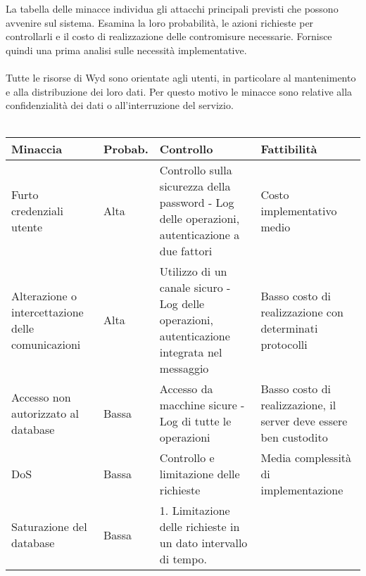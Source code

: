 La tabella delle minacce individua gli attacchi principali previsti che possono avvenire sul sistema.
Esamina la loro probabilità, le azioni richieste per controllarli e il costo di realizzazione delle contromisure necessarie.
Fornisce quindi una prima analisi sulle necessità implementative.\\
\\
Tutte le risorse di Wyd sono orientate agli utenti,
in particolare al mantenimento e alla distribuzione dei loro dati.
Per questo motivo le minacce sono relative alla confidenzialità dei dati o
all'interruzione del servizio.\\
\\
\begin{longtable}{|P{3.3cm}|P{1.6cm}|P{6.2cm}|P{4cm}|}
    \hline
    \textbf{Minaccia}                                                                           & \textbf{Probab.}                    & \textbf{Controllo}                                                                            & \textbf{Fattibilità}                                              \\
    \hline
    \endhead
    Furto credenziali utente                                                                    & Alta                                & Controllo sulla sicurezza della password - Log delle operazioni, autenticazione a due fattori & Costo implementativo medio                                        \\
    \hline
    Alterazione o intercettazione delle comunicazioni                                           & Alta                                & Utilizzo di un canale sicuro - Log delle operazioni, autenticazione integrata nel messaggio   & Basso costo di realizzazione con determinati protocolli           \\
    \hline
    Accesso non autorizzato al database                                                         & Bassa                               & Accesso da macchine sicure - Log di tutte le operazioni                                       & Basso costo di realizzazione, il server deve essere ben custodito \\
    \hline
    DoS                                                                                         & Bassa                               & Controllo e limitazione delle richieste                                                       & Media complessità di implementazione                              \\
    \hline
    Saturazione del database                                                                    & Bassa                               & 1. Limitazione delle richieste in un dato intervallo di tempo. \newline

\end{longtable}
